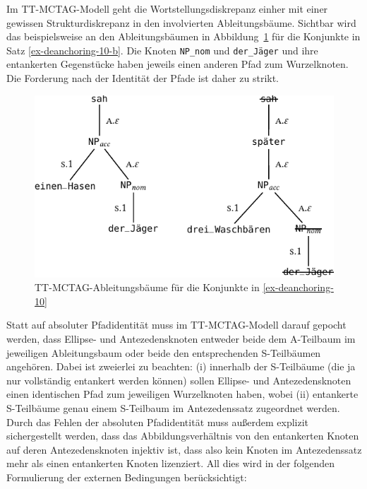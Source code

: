 Im TT-MCTAG-Modell geht die Wortstellungsdiskrepanz einher mit einer gewissen Strukturdiskrepanz in den involvierten Ableitungsbäume. Sichtbar wird das beispielsweise an den Ableitungsbäumen in Abbildung~\ref{fig-deanchoring-12} für die Konjunkte in Satz \ref{ex-deanchoring-10-b}. Die Knoten {\tt NP\_nom} und {\tt der\_Jäger} und ihre entankerten Gegenstücke haben jeweils einen anderen Pfad zum Wurzelknoten. Die Forderung nach der Identität der Pfade ist daher zu strikt. 
\begin{figure}[t]
\centering
\includegraphics{graphics/abb829.pdf}
\caption{\label{fig-deanchoring-12}TT-MCTAG-Ableitungsbäume für die Konjunkte in \ref{ex-deanchoring-10}}
\end{figure}
Statt auf absoluter Pfadidentität muss im TT-MCTAG-Modell darauf gepocht werden, dass Ellipse- und Antezedensknoten entweder beide dem A-Teilbaum im jeweiligen Ableitungsbaum oder beide den entsprechenden S-Teilbäumen angehören. Dabei ist zweierlei zu beachten: (i) innerhalb der S-Teilbäume (die ja nur vollständig entankert werden können) sollen Ellipse- und Antezedensknoten einen identischen Pfad zum jeweiligen Wurzelknoten haben, wobei (ii) entankerte S-Teilbäume genau einem S-Teilbaum im Antezedenssatz zugeordnet werden. Durch das Fehlen der absoluten Pfadidentität muss au\ss erdem explizit sichergestellt werden, dass das Abbildungsverhältnis von den entankerten Knoten auf deren Antezedensknoten injektiv ist, dass also kein Knoten im Antezedenssatz mehr als einen entankerten Knoten lizenziert. All dies wird in der folgenden Formulierung der externen Bedingungen berücksichtigt:  

